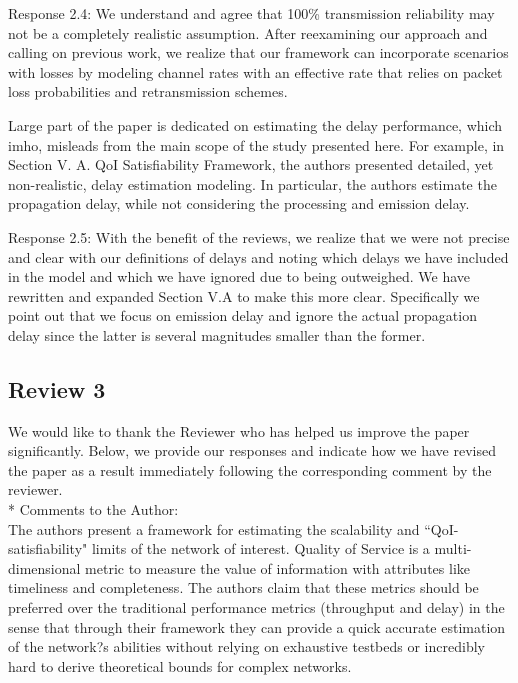 \documentclass[12pt, letterpaper, onecolumn]{IEEEtran}
\begin{document}
{\color{blue}
Response 2.4: We understand and agree that 100\% transmission reliability may not be a completely realistic assumption. After reexamining our approach and calling on previous work, we realize that our framework can incorporate scenarios with losses by modeling channel rates with an effective rate that relies on packet loss probabilities and retransmission schemes.
}

Large part of the paper is dedicated on estimating the delay performance, which imho, misleads from the main scope of the study presented here. For example, in Section V. A. QoI Satisfiability Framework, the authors presented detailed, yet non-realistic, delay estimation modeling. In particular, the authors estimate the propagation delay, while not considering the processing and emission delay. 

{\color{blue}
Response 2.5: With the benefit of the reviews, we realize that we were not precise and clear with our definitions of delays and noting which delays we have included in the model and which we have ignored due to being outweighed. We have rewritten and expanded Section V.A to make this more clear. Specifically we point out that we focus on emission delay and ignore the actual propagation delay since the latter is several magnitudes smaller than the former.
}


\newpage
\subsection{Review 3}

{ \color {blue}We would like to thank the Reviewer who has helped us improve the paper significantly. Below, we provide our responses and indicate how we have revised the paper as a result immediately following the corresponding comment by the reviewer.}\\

\noindent** Comments to the Author: \\
The authors present a framework for estimating the scalability and ``QoI-satisfiability" limits of the network of interest. Quality of Service is a multi-dimensional metric to measure the value of information with attributes like timeliness and completeness. The authors claim that these metrics should be preferred over the traditional performance metrics (throughput and delay) in the sense that through their framework they can provide a quick accurate estimation of the network?s abilities without relying on exhaustive testbeds or incredibly hard to derive theoretical bounds for complex networks.
\end{document}
